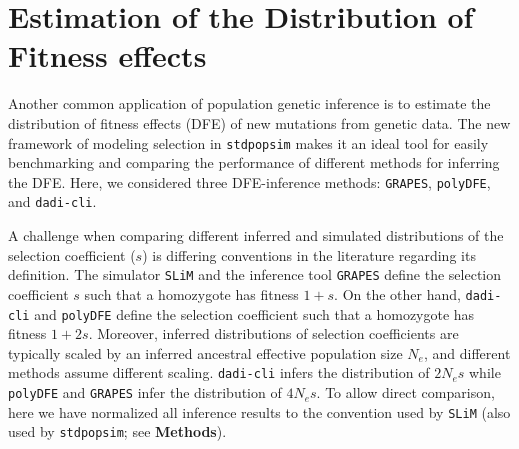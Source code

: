 \documentclass[hidelinks]{article}
\newcommand{\stdpopsim}{\texttt{stdpopsim}\xspace}
\newcommand{\slim}{\texttt{SLiM}\xspace}
\newcommand{\polydfe}{\texttt{polyDFE}\xspace}
\newcommand{\dadicli}{\texttt{dadi-cli}\xspace}
\newcommand{\grapes}{\texttt{GRAPES}\xspace}
\begin{document}
\section*{Estimation of the Distribution of Fitness effects}
    \label{dfe}
    Another common application of population genetic inference is to estimate the distribution of fitness effects (DFE) of new mutations
    from genetic data. The new framework of modeling selection in \stdpopsim makes it an ideal tool for easily benchmarking and comparing
    the performance of different methods for inferring the DFE.
    Here, we considered three DFE-inference methods:
    \grapes \citep{galtier2016adaptive}, \polydfe \citep{tataru2020polydfe}, and \dadicli \citep{Huang2023}.

    A challenge when comparing different inferred and simulated distributions of the selection coefficient ($s$)
    is differing conventions in the literature regarding its definition.
    The simulator \slim and the inference tool \grapes define the selection coefficient $s$ such that a homozygote has fitness $1+s$.
    On the other hand, \dadicli and \polydfe define the selection coefficient such that a homozygote has fitness $1+2s$.
    Moreover, inferred distributions of selection coefficients are typically scaled by an inferred ancestral
    effective population size $N_e$, and different methods assume different scaling.
    \dadicli infers the distribution of $2 N_e s$ while \polydfe and \grapes infer the distribution of $4 N_e s$.
    To allow direct comparison, here we have normalized all inference results to the convention used by \slim
    (also used by \stdpopsim; see \textbf{Methods}).
\end{document}
